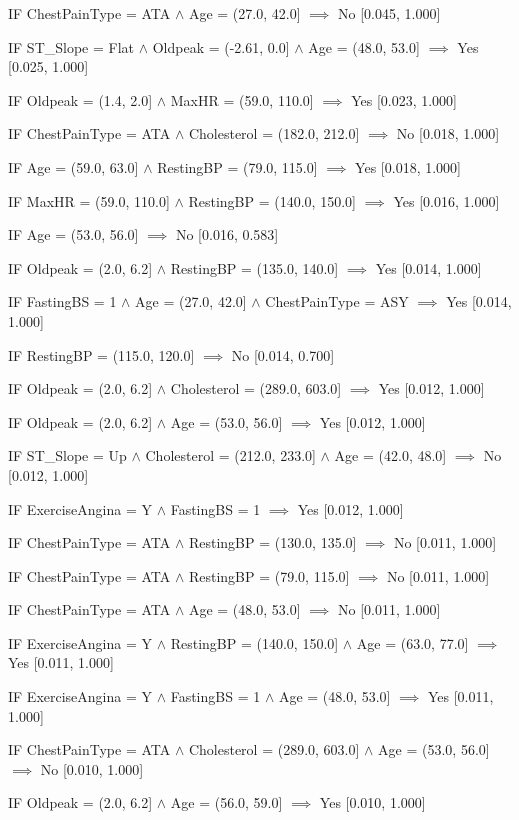 IF ChestPainType = ATA $\land$ Age = (27.0, 42.0] $\implies$ No [0.045, 1.000]

IF ST\_Slope = Flat $\land$ Oldpeak = (-2.61, 0.0] $\land$ Age = (48.0, 53.0] $\implies$ Yes [0.025, 1.000]

IF Oldpeak = (1.4, 2.0] $\land$ MaxHR = (59.0, 110.0] $\implies$ Yes [0.023, 1.000]

IF ChestPainType = ATA $\land$ Cholesterol = (182.0, 212.0] $\implies$ No [0.018, 1.000]

IF Age = (59.0, 63.0] $\land$ RestingBP = (79.0, 115.0] $\implies$ Yes [0.018, 1.000]

IF MaxHR = (59.0, 110.0] $\land$ RestingBP = (140.0, 150.0] $\implies$ Yes [0.016, 1.000]

IF Age = (53.0, 56.0] $\implies$ No [0.016, 0.583]

IF Oldpeak = (2.0, 6.2] $\land$ RestingBP = (135.0, 140.0] $\implies$ Yes [0.014, 1.000]

IF FastingBS = 1 $\land$ Age = (27.0, 42.0] $\land$ ChestPainType = ASY $\implies$ Yes [0.014, 1.000]

IF RestingBP = (115.0, 120.0] $\implies$ No [0.014, 0.700]

IF Oldpeak = (2.0, 6.2] $\land$ Cholesterol = (289.0, 603.0] $\implies$ Yes [0.012, 1.000]

IF Oldpeak = (2.0, 6.2] $\land$ Age = (53.0, 56.0] $\implies$ Yes [0.012, 1.000]

IF ST\_Slope = Up $\land$ Cholesterol = (212.0, 233.0] $\land$ Age = (42.0, 48.0] $\implies$ No [0.012, 1.000]

IF ExerciseAngina = Y $\land$ FastingBS = 1 $\implies$ Yes [0.012, 1.000]

IF ChestPainType = ATA $\land$ RestingBP = (130.0, 135.0] $\implies$ No [0.011, 1.000]

IF ChestPainType = ATA $\land$ RestingBP = (79.0, 115.0] $\implies$ No [0.011, 1.000]

IF ChestPainType = ATA $\land$ Age = (48.0, 53.0] $\implies$ No [0.011, 1.000]

IF ExerciseAngina = Y $\land$ RestingBP = (140.0, 150.0] $\land$ Age = (63.0, 77.0] $\implies$ Yes [0.011, 1.000]

IF ExerciseAngina = Y $\land$ FastingBS = 1 $\land$ Age = (48.0, 53.0] $\implies$ Yes [0.011, 1.000]

IF ChestPainType = ATA $\land$ Cholesterol = (289.0, 603.0] $\land$ Age = (53.0, 56.0] $\implies$ No [0.010, 1.000]

IF Oldpeak = (2.0, 6.2] $\land$ Age = (56.0, 59.0] $\implies$ Yes [0.010, 1.000]

